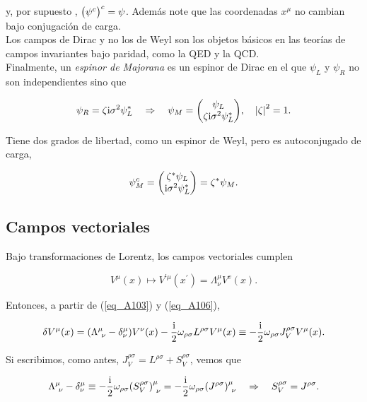 y, por supuesto , $\qty\big(\psi^{c})^{c} = \psi$. Además note que las coordenadas $x^{\mu}$ no cambian bajo conjugación de carga.\\

Los campos de Dirac y no los de Weyl son los objetos básicos en las teorías de campos invariantes bajo paridad, como la QED y la QCD.\\

Finalmente, un \emph{espinor de Majorana} es un espinor de Dirac en el que $\psi_L$ y $\psi_R$ no son independientes sino que

\begin{equation}
    \psi_R=\zeta \ii \sigma^2 \psi_L^* \quad \Rightarrow \quad \psi_M=\mqty(\psi_L \\ \zeta \ii \sigma^2 \psi_L^*), \quad  \abs{\zeta}^2=1.
\end{equation}

Tiene dos grados de libertad, como un espinor de Weyl, pero es autoconjugado de carga,

\begin{equation}
    \psi_M^c=\mqty(\zeta^* \psi_L \\ \ii \sigma^2 \psi_L^*) = \zeta^* \psi_M.
\end{equation}

\subsection{Campos vectoriales}

Bajo transformaciones de Lorentz, los campos vectoriales cumplen

\begin{equation}
    V^\mu(x) \mapsto V^{\prime \mu}\left(x^{\prime}\right)=\Lambda_\nu^\mu V^v(x) .
\end{equation}

Entonces, a partir de (\ref{eq_A103}) y (\ref{eq_A106}),

\begin{equation}
    \delta V^\mu(x)=\qty(\Lambda_{~\nu}^\mu-\delta_\nu^\mu) V^\nu(x)-\frac{\mathrm{i}}{2} \omega_{\rho \sigma} L^{\rho \sigma} V^\mu(x) \equiv-\frac{\mathrm{i}}{2} \omega_{\rho \sigma} J_V^{\rho \sigma} V^\mu(x) .
\end{equation}


Si escribimos, como antes, $J_V^{\rho \sigma}=L^{\rho \sigma}+S_V^{\rho \sigma}$, vemos que

\begin{equation}
    \Lambda_{~\nu}^\mu-\delta_{\nu}^\mu \equiv-\frac{\mathrm{i}}{2} \omega_{\rho \sigma}\qty(S_V^{\rho \sigma})^{\mu}_{~\nu}=-\frac{\mathrm{i}}{2} \omega_{\rho \sigma}\qty(J^{\rho \sigma})_{~\nu}^{\mu} \quad \Rightarrow \quad S_V^{\rho \sigma}=J^{\rho \sigma}.
\end{equation}

